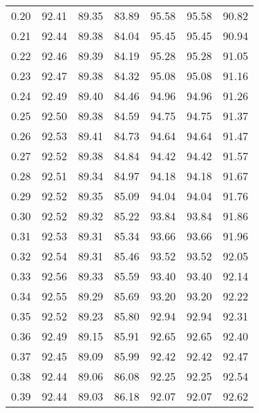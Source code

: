 \begin{tabular}{|c|c|c|c|c|c|c|}
      0.20 &     92.41 &     89.35 &      83.89 &   95.58 &      95.58 &         90.82 \\
      0.21 &     92.44 &     89.38 &      84.04 &   95.45 &      95.45 &         90.94 \\
      0.22 &     92.46 &     89.39 &      84.19 &   95.28 &      95.28 &         91.05 \\
      0.23 &     92.47 &     89.38 &      84.32 &   95.08 &      95.08 &         91.16 \\
      0.24 &     92.49 &     89.40 &      84.46 &   94.96 &      94.96 &         91.26 \\
      0.25 &     92.50 &     89.38 &      84.59 &   94.75 &      94.75 &         91.37 \\
      0.26 &     92.53 &     89.41 &      84.73 &   94.64 &      94.64 &         91.47 \\
      0.27 &     92.52 &     89.38 &      84.84 &   94.42 &      94.42 &         91.57 \\
      0.28 &     92.51 &     89.34 &      84.97 &   94.18 &      94.18 &         91.67 \\
      0.29 &     92.52 &     89.35 &      85.09 &   94.04 &      94.04 &         91.76 \\
      0.30 &     92.52 &     89.32 &      85.22 &   93.84 &      93.84 &         91.86 \\
      0.31 &     92.53 &     89.31 &      85.34 &   93.66 &      93.66 &         91.96 \\
      0.32 &     92.54 &     89.31 &      85.46 &   93.52 &      93.52 &         92.05 \\
      0.33 &     92.56 &     89.33 &      85.59 &   93.40 &      93.40 &         92.14 \\
      0.34 &     92.55 &     89.29 &      85.69 &   93.20 &      93.20 &         92.22 \\
      0.35 &     92.52 &     89.23 &      85.80 &   92.94 &      92.94 &         92.31 \\
      0.36 &     92.49 &     89.15 &      85.91 &   92.65 &      92.65 &         92.40 \\
      0.37 &     92.45 &     89.09 &      85.99 &   92.42 &      92.42 &         92.47 \\
      0.38 &     92.44 &     89.06 &      86.08 &   92.25 &      92.25 &         92.54 \\
      0.39 &     92.44 &     89.03 &      86.18 &   92.07 &      92.07 &         92.62 \\

\end{tabular}
